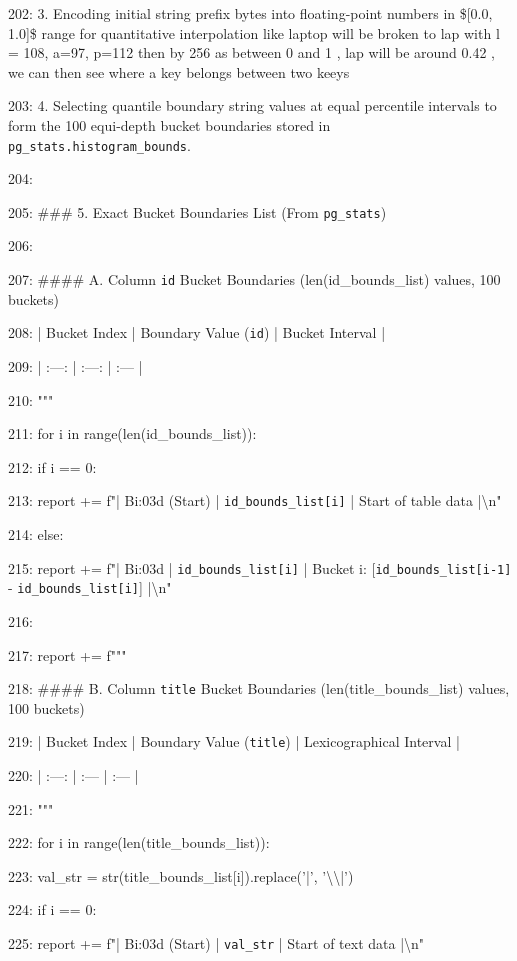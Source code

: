 \documentclass[11pt,a4paper]{article}
\begin{document}
202: 3. Encoding initial string prefix bytes into floating-point numbers in \$[0.0, 1.0]\$ range for quantitative interpolation like laptop will be broken to lap with l = 108, a=97, p=112 then by 256 as between 0 and 1 , lap will be around 0.42 , we can then see where a key belongs between two keeys

203: 4. Selecting quantile boundary string values at equal percentile intervals to form the 100 equi-depth bucket boundaries stored in \texttt{pg\_stats.histogram\_bounds}.

204:

205: \#\#\# 5. Exact Bucket Boundaries List (From \texttt{pg\_stats})

206:

207: \#\#\#\# A. Column \texttt{id} Bucket Boundaries ({len(id\_bounds\_list)} values, 100 buckets)

208: | Bucket Index | Boundary Value (\texttt{id}) | Bucket Interval |

209: | :---: | :---: | :--- |

210: """

211:     for i in range(len(id\_bounds\_list)):

212:         if i == 0:

213:             report += f"| B{i:03d} (Start) | \texttt{{id\_bounds\_list[i]}} | Start of table data |\textbackslash{}n"

214:         else:

215:             report += f"| B{i:03d} | \texttt{{id\_bounds\_list[i]}} | Bucket {i}: [\texttt{{id\_bounds\_list[i-1]}} - \texttt{{id\_bounds\_list[i]}}] |\textbackslash{}n"

216:

217:     report += f"""

218: \#\#\#\# B. Column \texttt{title} Bucket Boundaries ({len(title\_bounds\_list)} values, 100 buckets)

219: | Bucket Index | Boundary Value (\texttt{title}) | Lexicographical Interval |

220: | :---: | :--- | :--- |

221: """

222:     for i in range(len(title\_bounds\_list)):

223:         val\_str = str(title\_bounds\_list[i]).replace('|', '\textbackslash{}\textbackslash{}|')

224:         if i == 0:

225:             report += f"| B{i:03d} (Start) | \texttt{{val\_str}} | Start of text data |\textbackslash{}n"
\end{document}
